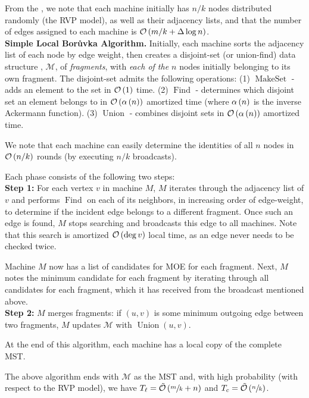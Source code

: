 From the , we note that each machine initially has \(n/k\) nodes distributed randomly (the RVP model), as well as their adjacency lists, and that
the number of edges assigned to each machine is $\mathcal{O}\left(m/k + \Delta \log n\right)$.  \\

\noindent \textbf{Simple Local Bor\r{u}vka Algorithm.}
Initially, each machine sorts the adjacency list of each node by edge weight, then creates a disjoint-set (or union-find) data structure \cite{CLRS09}, \(\mathcal{M}\), of \emph{fragments}, with \emph{each of the \(n\)} nodes initially belonging to its own fragment. The disjoint-set admits the following operations: (1) \(\operatorname{MakeSet}\) - adds an element to the set in \(\mathcal{O}\left(1\right)\) time. (2) \(\operatorname{Find}\) - determines which disjoint set an element belongs to in \(\mathcal{O}\left(\alpha\left(n\right)\right)\) amortized time (where $\alpha\left(n\right)$ is the inverse Ackermann function). (3) \(\operatorname{Union}\) - combines disjoint sets in \(\mathcal{O}\left(\alpha\left(n\right)\right)\) amortized time.



We note that each machine can easily determine the identities of all \(n\) nodes in \(\mathcal{O}\left(n/k\right)\) rounds (by executing \(n/k\) broadcasts).

Each phase consists of the following two steps:\\
\textbf{Step 1:} For each vertex \(v\) in machine \(M\), \(M\) iterates through the adjacency list of \(v\) and performs \(\operatorname{Find}\) on each of its neighbors, in increasing order of edge-weight, to determine if the incident edge belongs to a different fragment. Once such an edge is found, \(M\) stops searching and broadcasts this edge to all machines. Note that this search is amortized \(\mathcal{O}\left(\deg{v}\right)\) local time, as an edge never needs to be checked twice.

Machine $M$ now has a list of candidates for MOE for each fragment. Next, \(M\) notes the minimum candidate for each fragment by iterating through all candidates for each fragment, which it has received from the broadcast mentioned above.\\
\textbf{Step 2:} \(M\) merges fragments: if \((u, v)\) is some minimum outgoing edge between two fragments, \(M\) updates \(\mathcal{M}\) with \(\operatorname{Union}(u, v)\).

At the end of this algorithm, each machine has a local copy of the complete MST.
\begin{theorem}
    \label{thm:gh1}
    The above algorithm ends with \(\mathcal{M}\) as the MST and, with high probability (with respect to the RVP model), we have $T_{\ell} = \tilde{\mathcal{O}}\left(\sfrac{m}{k} + n\right)$ and $T_c = \tilde{\mathcal{O}}\left(\sfrac{n}{k}\right)$.
\end{theorem}


